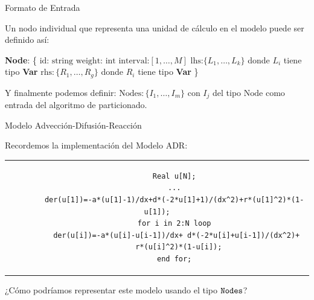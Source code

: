 \begin{frame}{Formato de Entrada}

  Un nodo individual que representa una unidad de cálculo en el modelo puede ser 
definido así:

\begin{small}
    \begin{algorithm}[H]
        \begin{algorithmic}\caption{Tipo Node}
            \State \textbf{Node}: \{
                \State $\text{id: string}$
                \State $\text{weight: int}$
                \State $\text{interval:} [1,\dots,M]$
                \State $\text{lhs:}  \{ L_1, \dots, L_k \}$ donde $L_i$ tiene tipo \textbf{Var}
                \State $\text{rhs} :  \{ R_1, \dots, R_g \}$ donde $R_i$ tiene tipo \textbf{Var}
            \State \}
        \end{algorithmic}
    \end{algorithm}
\end{small}

Y finalmente podemos definir: $\text{Nodes} : \{ I_1, \dots, I_m\}$ con $I_j$
del tipo $\text{Node}$ como entrada del algoritmo de particionado.
\end{frame}


\begin{frame}[fragile]{Modelo Advección-Difusión-Reacción}

Recordemos la implementación del Modelo ADR:

\begin{center}
  \begin{tabular}{c}
  \lstset{
      basicstyle=\scriptsize,
      emph={u},
      emphstyle=\color{red},
      morekeywords={u},
      keywordstyle=\bfseries,
      escapeinside={(*@}{@*)}
  }
    \begin{lstlisting}
        Real u[N];
        ...
        der(u[1])=-a*(u[1]-1)/dx+d*(-2*u[1]+1)/(dx^2)+r*(u[1]^2)*(1-u[1]);
        for i in 2:N loop
          der(u[i])=-a*(u[i]-u[i-1])/dx+ d*(-2*u[i]+u[i-1])/(dx^2)+ 
          r*(u[i]^2)*(1-u[i]);
        end for;
    \end{lstlisting}
  \end{tabular}

  \vspace{2em}

  ¿Cómo podríamos representar este modelo usando el tipo $\verb|Nodes|$?
\end{center}

\end{frame}


